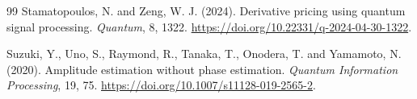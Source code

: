 \documentclass[11pt]{article}
\begin{document}
\begin{thebibliography}{99}
 Stamatopoulos, N. and Zeng, W. J. (2024). Derivative pricing using quantum signal processing. \emph{Quantum}, 8, 1322. \url{https://doi.org/10.22331/q-2024-04-30-1322}.

Suzuki, Y., Uno, S., Raymond, R., Tanaka, T., Onodera, T. and Yamamoto, N. (2020).
Amplitude estimation without phase estimation. \emph{Quantum Information Processing}, 19, 75.
\url{https://doi.org/10.1007/s11128-019-2565-2}.
\end{thebibliography}
\end{document}
